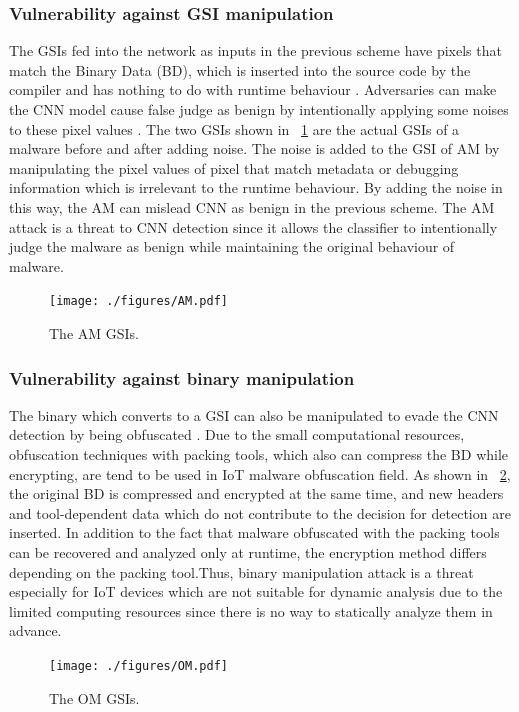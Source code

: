 \documentclass{ieeeaccess}
\begin{document}
\subsubsection{Vulnerability against GSI manipulation}
The GSIs fed into the network as inputs in the previous scheme have pixels that match the Binary Data (BD), which is inserted into the source code by the compiler and has nothing to do with runtime behaviour \cite{am}.
Adversaries can make the CNN model cause false judge as benign by intentionally applying some noises to these pixel values \cite{am}.
The two GSIs shown in \figurename~\ref{fig:amGSI} are the actual GSIs of a malware before and after adding noise.
The noise is added to the GSI of AM by manipulating the pixel values of pixel that match metadata or debugging information which is irrelevant to the runtime behaviour.
By adding the noise in this way, the AM can mislead CNN as benign in the previous scheme.
The AM attack is a threat to CNN detection since it allows the classifier to intentionally judge the malware as benign while maintaining the original behaviour of malware.

\begin{figure}[t]
 \centering
 \texttt{[image: ./figures/AM.pdf]}
 \caption{The AM GSIs.} 
 \label{fig:amGSI}
\end{figure}
\subsubsection{Vulnerability against binary manipulation}
The binary which converts to a GSI can also be manipulated to evade the CNN detection by being obfuscated \cite{om}.
Due to the small computational resources, obfuscation techniques with packing tools, which also can compress the BD while encrypting, are tend to be used in IoT malware obfuscation field.
As shown in \figurename~\ref{fig:omGSI}, the original BD is compressed and encrypted at the same time, and new headers and tool-dependent data which do not contribute to the decision for detection are inserted.
In addition to the fact that malware obfuscated with the packing tools can be recovered and analyzed only at runtime, the encryption method differs depending on the packing tool.Thus, binary manipulation attack is a threat especially for IoT devices which are not suitable for dynamic analysis due to the limited computing resources since there is no way to statically analyze them in advance.

\begin{figure}[t]
 \centering
 \texttt{[image: ./figures/OM.pdf]}
 \caption{The OM GSIs.} 
 \label{fig:omGSI}
\end{figure}
\end{document}
